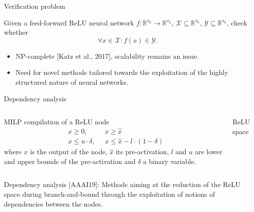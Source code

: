 \documentclass[10pt]{beamer}
\begin{document}

\begin{frame}{Verification problem}

\begin{definition}
	Given a feed-forward ReLU neural  network $f \colon \mathbb R^{s_0}
	\rightarrow \mathbb{R}^{s_k}$, $\mathcal X \subseteq
	\mathbb R^{s_0}$, $\mathcal Y \subseteq \mathbb
	R^{s_k}$, check whether 
\[
	\forall  x \in \mathcal X  \colon f(x) \in
	\mathcal Y.
\]
\end{definition}

\vspace{2em}

\begin{itemize}  \itemsep 1em
	\item NP-complete [Katz et al., 2017], \alert{scalability} remains an issue.
	\item Need for novel methods tailored towards the exploitation of
		the highly structured nature of neural networks.
\end{itemize}

\end{frame}


\begin{frame}{Dependency analysis}

\begin{columns}
\begin{column}{0.5\textwidth}
\begin{block}{MILP compilation of a ReLU node}
		\vspace{-1.5em}
\begin{align*}
	&x \geq 0, \;\;\;\;\;\;\;\;\; x \geq \hat{x} \\
	&x \leq u \cdot \delta, \;\;\;\;\; x \leq \hat{x} - l \cdot (1 - \delta)
\end{align*}
where $x$ is the output of the node, $\hat{x}$ its
pre-activation, $l$ and $u$ are  lower and upper bounds of the pre-activation 
 and $\delta$ a
binary variable.
\end{block}
\end{column}
\begin{column}{0.5\textwidth}
\begin{block}{ReLU space}
	\begin{center}
	
\end{center}
\end{block}
\end{column}
\end{columns}
\vspace{2em}
\alert{Dependency analysis} [AAAI19]:   Methods aiming at the
reduction of the ReLU space during branch-and-bound through the
exploitation of notions of dependencies between the nodes. \end{frame}
\end{document}
